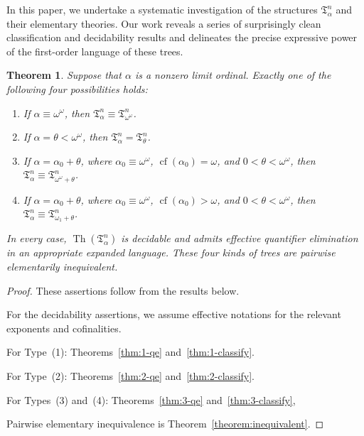 \documentclass{amsart}
\newcommand{\cf}{\operatorname{cf}}
\newtheorem{theorem}{Theorem}
\theoremstyle{definition}
\begin{document}
In this paper, we undertake a systematic investigation of the structures $\mathfrak{T}_\alpha^n$ and their elementary theories. Our work reveals a series of surprisingly clean classification and decidability results and delineates the precise expressive power of the first-order language of these trees.

\begin{theorem}
    Suppose that $\alpha$ is a nonzero limit ordinal. Exactly one of the following four possibilities holds:
    \begin{enumerate}
        \item If $\alpha\equiv\omega^\omega$, then $\mathfrak T_\alpha^n\equiv\mathfrak T_{\omega^\omega}^n$.
        \item If $\alpha=\theta<\omega^\omega$, then $\mathfrak T_\alpha^n=\mathfrak T_\theta^n$.
        \item If $\alpha=\alpha_0+\theta$, where $\alpha_0\equiv\omega^\omega$, $\cf(\alpha_0)=\omega$, and $0<\theta<\omega^\omega$, then $\mathfrak T_\alpha^n\equiv\mathfrak T_{\omega^\omega+\theta}^n$.
        \item If $\alpha=\alpha_0+\theta$, where $\alpha_0\equiv\omega^\omega$, $\cf(\alpha_0)>\omega$, and $0<\theta<\omega^\omega$, then $\mathfrak T_\alpha^n\equiv\mathfrak T_{\omega_1+\theta}^n$.
    \end{enumerate}
    In every case, $\operatorname{Th}(\mathfrak T_\alpha^n)$ is decidable and admits effective quantifier elimination in an appropriate expanded language. These four kinds of trees are pairwise elementarily inequivalent.
\end{theorem}
\begin{proof}
  These assertions follow from the results below.

  For the decidability assertions, we assume effective notations for the relevant exponents and cofinalities.

  For Type~(1): Theorems~\ref{thm:1-qe} and~\ref{thm:1-classify}.

  For Type~(2): Theorems~\ref{thm:2-qe} and~\ref{thm:2-classify}.

  For Types~(3) and~(4): Theorems~\ref{thm:3-qe} and~\ref{thm:3-classify},

  Pairwise elementary inequivalence is Theorem~\ref{theorem:inequivalent}.

\end{proof}
\end{document}
